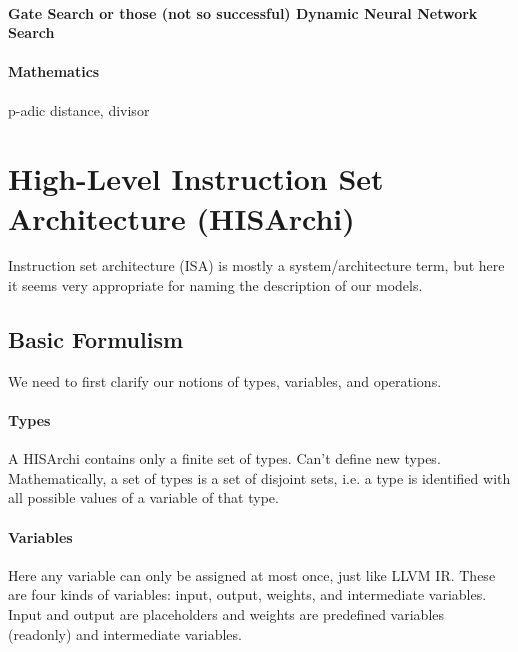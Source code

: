 \documentclass[10pt, oneside]{article}   	%
\theoremstyle{definition}
\begin{document}
\paragraph{Gate Search or those (not so successful) Dynamic Neural Network Search}
\paragraph{Mathematics} p-adic distance, divisor











































\section{High-Level Instruction Set Architecture (HISArchi)}
Instruction set architecture (ISA) is mostly a system/architecture term, but here it seems very appropriate for naming the description of our models.
\subsection{Basic Formulism}
We need to first clarify our notions of types, variables, and operations.
\paragraph{Types} A HISArchi contains only a finite set of types. Can't define new types. Mathematically, a set of types is a set of disjoint sets, i.e. a type is identified with all possible values of a variable of that type.
\paragraph{Variables} Here any variable can only be assigned at most once, just like LLVM IR. These are four kinds of variables: input, output, weights, and intermediate variables. Input and output are placeholders and weights are predefined variables (readonly) and intermediate variables.
\end{document}

